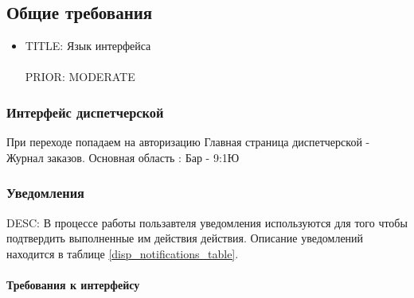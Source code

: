 \subsection{Общие требования}
	

	\begin{itemize}

		\item {
			TITLE: Язык интерфейса\\
			\\
			PRIOR: MODERATE\\}
			
	\end{itemize}

	\subsubsection{Интерфейс диспетчерской}

		При переходе попадаем на авторизацию
		Главная страница диспетчерской - Журнал заказов. Основная область : Бар - 9:1Ю 





	\subsubsection{Уведомления}

		DESC: В процессе работы пользавтеля уведомления используются для того чтобы подтвердить выполненные им действия действия. Описание уведомлений находится в таблице \ref{disp_notifications_table}.

		\paragraph{Требования к интерфейсу} \mbox{}\\


